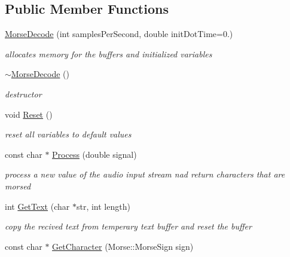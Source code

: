 \subsection*{Public Member Functions}
\begin{DoxyCompactItemize}
\item 
\hyperlink{classMorseDecode_a00821fde89334d379f1922fb70ba943b}{Morse\+Decode} (int samples\+Per\+Second, double init\+Dot\+Time=0.)
\begin{DoxyCompactList}\small\item\em allocates memory for the buffers and initialized variables \end{DoxyCompactList}\item 
\mbox{\label{classMorseDecode_ab12ba8f81a417aceb2d2c582ee0e8e07}} 
\hyperlink{classMorseDecode_ab12ba8f81a417aceb2d2c582ee0e8e07}{$\sim$\+Morse\+Decode} ()
\begin{DoxyCompactList}\small\item\em destructor \end{DoxyCompactList}\item 
\mbox{\label{classMorseDecode_ab3f09a593ee52afb44ef555a4c624a68}} 
void \hyperlink{classMorseDecode_ab3f09a593ee52afb44ef555a4c624a68}{Reset} ()
\begin{DoxyCompactList}\small\item\em reset all variables to default values \end{DoxyCompactList}\item 
const char $\ast$ \hyperlink{classMorseDecode_a9db5d2a826a6795f8a18cf123604d5a9}{Process} (double signal)
\begin{DoxyCompactList}\small\item\em process a new value of the audio input stream nad return characters that are morsed \end{DoxyCompactList}\item 
int \hyperlink{classMorseDecode_a04e9d8784d2e7eec8f725a6e65344839}{Get\+Text} (char $\ast$str, int length)
\begin{DoxyCompactList}\small\item\em copy the recived text from temperary text buffer and reset the buffer \end{DoxyCompactList}\item 
const char $\ast$ \hyperlink{classMorseDecode_a1d3c6ce0ee7c17c55e6ca102a4a6049a}{Get\+Character} (Morse\+::\+Morse\+Sign sign)

\end{DoxyCompactItemize}
